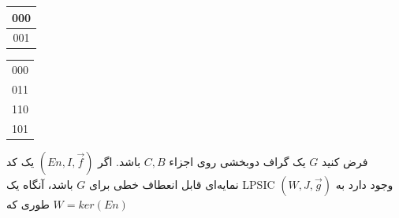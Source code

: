 \begin{example}
\begin{minipage}{0.49\textwidth}
       	       \end{minipage}
       \begin{minipage}{0.25\textwidth}
			        		\begin{tabular}{|c|}
			        			\hline
			        			000 \\
			        			\hline
			        			001 \\
			        			\hline
			        		\end{tabular}
			        	\end{minipage}
			             \begin{minipage}{0.25\textwidth}
	 		       		\begin{tabular}{|c|}
	 		       			\hline
	 		       			000  \\
	 		       			011   \\
	 		       			110  \\
	 		       			101   \\
	 		       			\hline
	 		       		\end{tabular}
	 		       	       				        	\end{minipage}

\end{example}

\begin{lemma}
    فرض کنید $G$ یک گراف دوبخشی روی اجزاء $C, B$ باشد. اگر $(En, I, \overrightarrow{f})$ یک کد نمایه‌ای قابل انعطاف خطی برای $G$ باشد، آنگاه یک LPSIC $(W, J, \overrightarrow{g})$ وجود دارد به طوری که $W  = ker(En)$
\end{lemma}


